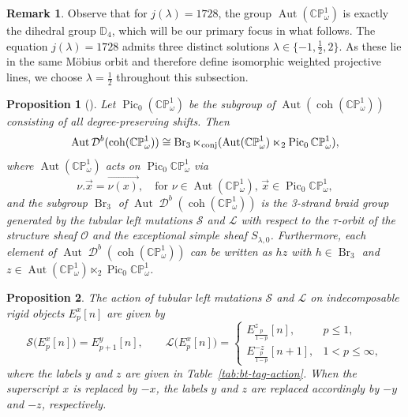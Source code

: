 \documentclass[11pt,a4paper,reqno]{amsart}%
\theoremstyle{plain}
\newtheorem{proposition}[proposition]{Proposition}
\theoremstyle{definition}
\newtheorem{remark}[remark]{Remark}
\numberwithin{equation}{section}
\numberwithin{equation}{section}
\newcommand{\D}{\operatorname{\mathcal{D}}}
\newcommand{\Pic}{\operatorname{Pic}\nolimits}
\def\wt{\omega}
\def\coh{\operatorname{coh}}
\def\Aut{\operatorname{Aut}}
\def\Br{\operatorname{Br}}
\newcommand{\tubR}{\mathcal{S}}
\newcommand{\tubL}{\mathcal{L}}
\def\coh{\operatorname{coh}}
\def\CPone{\mathbb{CP}^1_{\wt}}
\newcommand\DC[1]{\D^b(\coh(#1))}
\begin{document}
\begin{remark}
    Observe that for $j(\lambda)=1728$, the group $\Aut(\CPone)$ is exactly the dihedral group $\mathbb{D}_4$, which will be our primary focus in what follows. 
The equation  $j(\lambda)=1728$ admits three distinct solutions $\lambda\in \{-1,\frac12,2\}$. As these lie in the same  Möbius orbit and therefore define isomorphic weighted projective lines,  we choose $\lambda=\frac12$ throughout this subsection.%
\end{remark}
 \begin{proposition}[{\cite[Theorem~6.3]{LM}}]\label{prop:aut-cohCPone}
Let $\Pic_0(\CPone)$ be the subgroup of $\Aut(\coh(\CPone))$ consisting of all degree-preserving shifts.
Then  
\begin{equation}\label{aut of D}
     \Aut\DC{\CPone}\cong \Br_3\ltimes_{\rm conj}(\Aut(\CPone) \ltimes_2 \Pic_0\CPone), 
\end{equation}
where 
$\Aut(\CPone)$ acts on $ \Pic_0\CPone$ via
 \[
 \nu.\vec{x}= \overrightarrow{ \nu(x) }, \quad \text{for $\nu\in\Aut(\CPone)$, $\vec{x}\in  \Pic_0\CPone$},  
 \] 
and   the subgroup  
$\Br_3$ of $\Aut\DC{\CPone}$ is the 3-strand braid group generated by
the tubular left mutations $\tubR$ and $\tubL$  with 
respect to the $\tau$-orbit of the structure sheaf  $\mathcal{O}$ and   the  exceptional simple sheaf $S_{\lambda,0}$.
 Furthermore,  each element of $\Aut\DC{\CPone}$ can be  written as ${h}z$ with ${h}\in  \Br_3 $
     and $z\in \Aut(\CPone) \ltimes_2 \Pic_0\CPone$.

 \end{proposition}
\begin{proposition}\label{tubular left mutations} 
The action of  tubular left mutations $\tubR$ and $\tubL$   on indecomposable rigid objects $E_p^x[n]$ are given by
\begin{equation}\label{RL}
\tubR\bigl(E_{p}^x[n]\bigr)=E_{p+1}^y[n],\qquad
\tubL\bigl(E_{p}^x[n]\bigr)=
\begin{cases}
E_{\frac{p}{1-p}}^z[n],   & p\le 1,\\[4pt]
E_{\frac{p}{1-p}}^{-z}[n+1], & 1<p\le\infty,
\end{cases}
\end{equation}
where the labels $y$ and $z$ are given in Table~\ref{tab:bt-tag-action}. 
When the superscript $x$ is replaced by $-x$, the labels $y$ and $z$ are replaced accordingly by $-y$ and $-z$, respectively.
\end{proposition}
\end{document}
